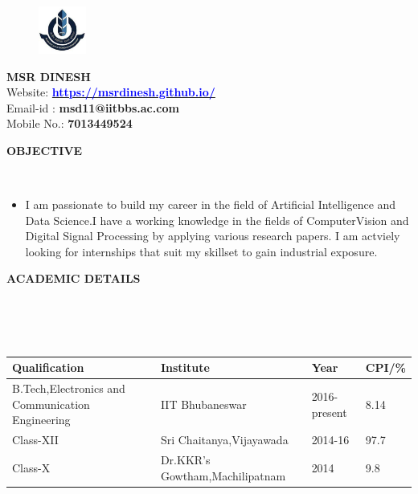 \documentclass[a4paper,10pt]{article}
\newcommand{\lsep}{-0.5cm}
\newcommand{\resheading}[1]{{\small \colorbox{mygrey}{\begin{minipage}{0.975\textwidth}{\textbf{#1 \vphantom{p\^{E}}}}\end{minipage}}}}
\begin{document}
\linespread{0.25}
\hspace{0.5cm}\\[-0.25cm]
\begin{figure}
\begin{flushleft}
\includegraphics[width=0.14\textwidth, left]{logo}
\end{flushleft}
\end{figure}


\begin{centering}
\bigbreak
\bigbreak
\bigbreak
\textbf{MSR DINESH} \\
\noindent Website: \href{https://msrdinesh.github.io/}{\textcolor{blue}{\textbf{https://msrdinesh.github.io/}}} \\
\noindent Email-id : \textbf{msd11@iitbbs.ac.com} \\
\noindent Mobile No.: \textbf{7013449524} \\
\end{centering}
\bigbreak
\bigbreak
\smallbreak
\smallbreak
\resheading{\textbf{OBJECTIVE} }\\[\lsep]
\smallbreak
\begin{itemize}
\item \noindent I am passionate to  build my career in the field of Artificial Intelligence and Data Science.I have a working knowledge in the fields of ComputerVision and Digital Signal Processing by applying various research papers. I am actviely looking for internships that suit my skillset to gain industrial exposure.  
\end{itemize}


\resheading{\textbf{ACADEMIC DETAILS} }\\[\lsep]
\\ \\
\indent \begin{tabular}{ |l @{\hskip 0.45in}| l @{\hskip 0.45in}| l |@{\hskip 0.45in} l|}
\hline
\textbf{Qualification} &  \textbf{Institute} & \textbf{Year} & \textbf{CPI/\%} \\
\hline
B.Tech,Electronics and Communication Engineering & IIT Bhubaneswar & 2016-present & 8.14 \\
Class-XII & Sri Chaitanya,Vijayawada & 2014-16 & 97.7\\
Class-X & Dr.KKR's Gowtham,Machilipatnam & 2014 & 9.8 \\

\hline
\end{tabular}
\\ \\
\end{document}
